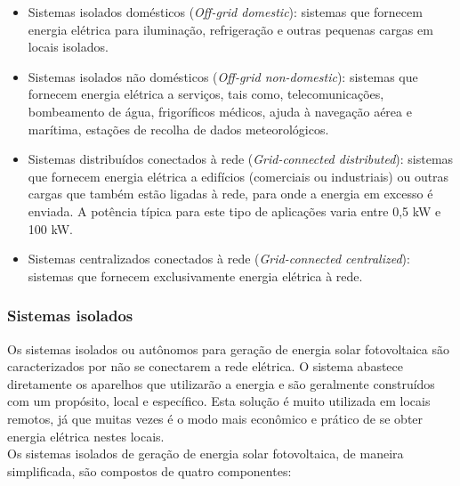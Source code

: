 \begin{itemize}
        \item Sistemas isolados dom\'esticos (\textit{Off-grid domestic}): sistemas que fornecem energia el\'etrica para ilumina\c{c}\~ao, refrigera\c{c}\~ao e outras pequenas cargas em locais isolados. 
	\item Sistemas isolados n\~ao dom\'esticos (\textit{Off-grid non-domestic}): sistemas que fornecem energia el\'etrica a servi\c{c}os, tais como, telecomunica\c{c}\~oes, bombeamento de \'agua, frigor\'ificos m\'edicos, ajuda \`a navega\c{c}\~ao a\'erea e mar\'itima, esta\c{c}\~oes de recolha de dados meteorol\'ogicos.
	\item Sistemas distribu\'idos conectados \`a rede (\textit{Grid-connected distributed}): sistemas que fornecem energia el\'etrica a edif\'icios (comerciais ou industriais) ou outras cargas que tamb\'em est\~ao ligadas \`a rede, para onde a energia em excesso \'e enviada. A pot\^encia t\'ipica para este tipo de aplica\c{c}\~oes varia entre 0,5 kW e 100 kW.
	\item Sistemas centralizados conectados \`a rede (\textit{Grid-connected centralized}): sistemas que fornecem exclusivamente energia el\'etrica \`a rede.
\end{itemize}

\subsubsection{Sistemas isolados}

Os sistemas isolados ou aut\^onomos para gera\c{c}\~ao de energia solar fotovoltaica s\~ao caracterizados por n\~ao se conectarem a rede el\'etrica. O sistema abastece diretamente os aparelhos que utilizar\~ao a energia e s\~ao geralmente constru\'idos com um prop\'osito, local e espec\'ifico. Esta solu\c{c}\~ao \'e muito utilizada em locais remotos, j\'a que muitas vezes \'e o modo mais econ\^omico e pr\'atico de se obter energia el\'etrica nestes locais. \\ Os sistemas isolados de gera\c{c}\~ao de energia solar fotovoltaica, de maneira simplificada, s\~ao compostos de quatro componentes:


